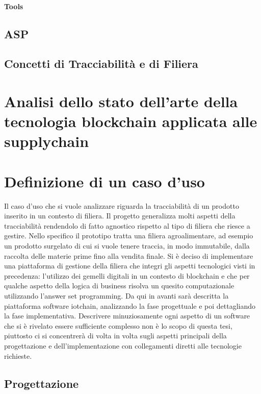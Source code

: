 \documentclass[a4paper,11pt]{article}
\begin{document}

\paragraph{Tools}
\subsection{ASP}

\subsection{Concetti di Tracciabilità e di Filiera}
\section{Analisi dello stato dell’arte della tecnologia blockchain applicata alle supplychain}
\section{Definizione di un caso d’uso}
Il caso d'uso che si vuole analizzare riguarda la tracciabilità di un prodotto inserito in un contesto di filiera. Il progetto generalizza molti aspetti della tracciabilità rendendolo di fatto agnostico rispetto al tipo di filiera che riesce a gestire. Nello specifico il prototipo tratta una filiera agroalimentare, ad esempio un prodotto surgelato di cui si vuole tenere traccia, in modo immutabile, dalla raccolta delle materie prime fino alla vendita finale. Si è deciso di implementare una piattaforma di gestione della filiera che integri gli aspetti tecnologici visti in precedenza: l'utilizzo dei gemelli digitali in un contesto di blockchain e che per qualche aspetto della logica di business risolva un quesito computazionale utilizzando l'answer set programming. Da qui in avanti sarà descritta la piattaforma software iotchain, analizzando la fase progettuale e poi dettagliando la fase implementativa. Descrivere minuziosamente ogni aspetto di un software che si è rivelato essere sufficiente complesso non è lo scopo di questa tesi, piuttosto ci si concentrerà di volta in volta sugli aspetti principali della progettazione e dell'implementazione con collegamenti diretti alle tecnologie richieste.

\subsection{Progettazione}
\end{document}
